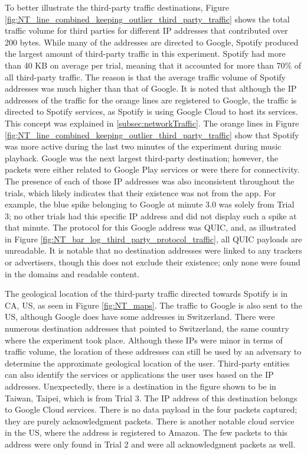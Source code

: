 To better illustrate the third-party traffic destinations, Figure \ref{fig:NT_line_combined_keeping_outlier_third_party_traffic} shows the total traffic volume for third parties for different IP addresses that contributed over 200 bytes. While many of the addresses are directed to Google, Spotify produced the largest amount of third-party traffic in this experiment. Spotify had more than 40 KB on average per trial, meaning that it accounted for more than 70\% of all third-party traffic. The reason is that the average traffic volume of Spotify addresses was much higher than that of Google. It is noted that although the IP addresses of the traffic for the orange lines are registered to Google, the traffic is directed to Spotify services, as Spotify is using Google Cloud to host its services. This concept was explained in \ref{subsec:networkTraffic}. The orange lines in Figure \ref{fig:NT_line_combined_keeping_outlier_third_party_traffic} show that Spotify was more active during the last two minutes of the experiment during music playback. Google was the next largest third-party destination; however, the packets were either related to Google Play services or were there for connectivity. The presence of each of those IP addresses was also inconsistent throughout the trials, which likely indicates that their existence was not from the app. For example, the blue spike belonging to Google at minute 3.0 was solely from Trial 3; no other trials had this specific IP address and did not display such a spike at that minute. The protocol for this Google address was QUIC, and, as illustrated in Figure \ref{fig:NT_bar_log_third_party_protocol_traffic}, all QUIC payloads are unreadable. It is notable that no destination addresses were linked to any trackers or advertisers, though this does not exclude their existence; only none were found in the domains and readable content. 
    
The geological location of the third-party traffic directed towards Spotify is in CA, US, as seen in Figure \ref{fig:NT_maps}. The traffic to Google is also sent to the US, although Google does have some addresses in Switzerland. There were numerous destination addresses that pointed to Switzerland, the same country where the experiment took place. Although these IPs were minor in terms of traffic volume, the location of these addresses can still be used by an adversary to determine the approximate geological location of the user. Third-party entities can also identify the services or applications the user uses based on the IP addresses. Unexpectedly, there is a destination in the figure shown to be in Taiwan, Taipei, which is from Trial 3. The IP address of this destination belongs to Google Cloud services. There is no data payload in the four packets captured; they are purely acknowledgment packets. There is another notable cloud service in the US, where the address is registered to Amazon. The few packets to this address were only found in Trial 2 and were all acknowledgment packets as well.

